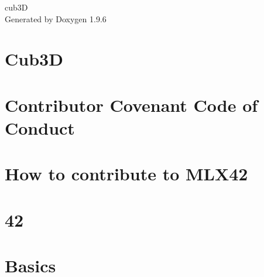 \documentclass[twoside]{book}
\newcommand{\+}{\discretionary{\mbox{\scriptsize$\hookleftarrow$}}{}{}}
\newcommand{\clearemptydoublepage}{%
    \newpage{\pagestyle{empty}\cleardoublepage}%
  }
\begin{document}
  \raggedbottom
    \hypersetup{pageanchor=false,
                bookmarksnumbered=true,
                pdfencoding=unicode
               }
  \begin{titlepage}
  \vspace*{7cm}
  \begin{center}%
  {\Large cub3D}\\
  \vspace*{1cm}
  {\large Generated by Doxygen 1.9.6}\\
  \end{center}
  \end{titlepage}
  \clearemptydoublepage
  \tableofcontents
  \clearemptydoublepage
  \hypersetup{pageanchor=true}
\chapter{Cub3D}
\label{index}\hypertarget{index}{}
\chapter{Contributor Covenant Code of Conduct}
\label{md__home_ssergiu_projects_cub3d_external_MLX42_CODE_OF_CONDUCT}

\chapter{How to contribute to MLX42}
\label{md__home_ssergiu_projects_cub3d_external_MLX42_CONTRIBUTING}

\chapter{42}
\label{md__home_ssergiu_projects_cub3d_external_MLX42_docs_42}

\chapter{Basics}
\label{md__home_ssergiu_projects_cub3d_external_MLX42_docs_Basics}

\end{document}
